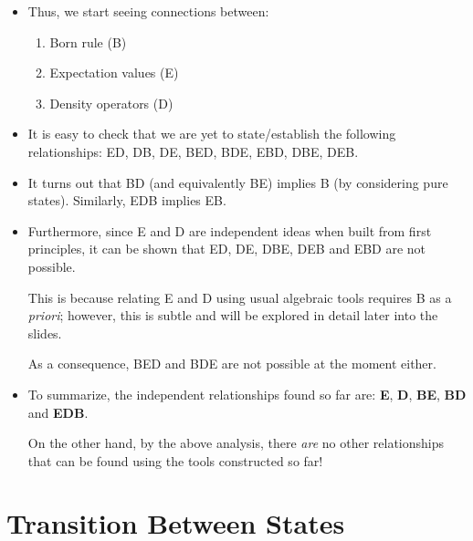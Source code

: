 \documentclass[9pt,handout]{beamer}
\begin{document}
\begin{frame}{}
\begin{itemize}
\item Thus, we start seeing connections between:

\begin{enumerate}
\item Born rule (B)
\item Expectation values (E)
\item Density operators (D)
\end{enumerate}

\item It is easy to check that we are yet to state/establish the following relationships: ED, DB, DE, BED, BDE, EBD, DBE, DEB. 

\item It turns out that BD (and equivalently BE) implies B (by considering pure states). Similarly, EDB implies EB.

\item Furthermore, since E and D are independent ideas when built from first principles, it can be shown that ED, DE, DBE, DEB and EBD are not possible. 

This is because relating E and D using usual algebraic tools requires B as a \emph{priori}; however, this is subtle and will be explored in detail later into the slides.

As a consequence, BED and BDE are not possible at the moment either.

\item To summarize, the independent relationships found so far are: \textbf{E}, \textbf{D}, \textbf{BE}, \textbf{BD} and \textbf{EDB}.

On the other hand, by the above analysis, there \emph{are} no other relationships that can be found using the tools constructed so far!
\end{itemize}
\end{frame}

\section{Transition Between States}
\end{document}
